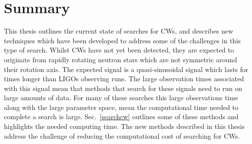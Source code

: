 \chapter{\label{summary}Summary}

This thesis outlines the current state of searches for \glspl{CW}, and describes new techniques which have been developed to address some of the challenges in this type of search.
Whilst \glspl{CW} have not yet been detected, they are expected to originate from rapidly rotating neutron stars which are not symmetric around their rotation axis.
The expected signal is a quasi-sinusoidal signal which lasts for times longer than \glspl{LIGO} observing runs.
The large observation times associated with this signal mean that methods that search for these signals need to run on large amounts of data.
For many of these searches this large observations time along with the large parameter space, mean the computational time needed to complete a search is large. 
Sec.~\ref{searchcw} outlines some of these methods and highlights the needed computing time.
The new methods described in this thesis address the challenge of reducing the computational cost of searching for \glspl{CW}.

\bigskip

